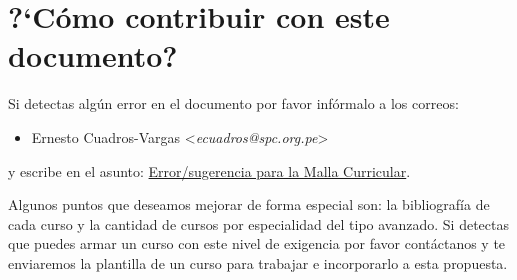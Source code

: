 \section*{?`Cómo contribuir con este documento?}
%

Si detectas algún error en el documento por favor infórmalo a los correos: 

\begin{itemize}
\item Ernesto Cuadros-Vargas <\textit{ecuadros@spc.org.pe}>
\end{itemize}
y escribe en el asunto: \underline{Error/sugerencia para la Malla Curricular}.

Algunos puntos que deseamos mejorar de forma especial son: la bibliografía de cada 
curso y la cantidad de cursos por especialidad del tipo avanzado. Si detectas que 
puedes armar un curso con este nivel de exigencia por favor contáctanos y te enviaremos 
la plantilla de un curso para trabajar e incorporarlo a esta propuesta.


